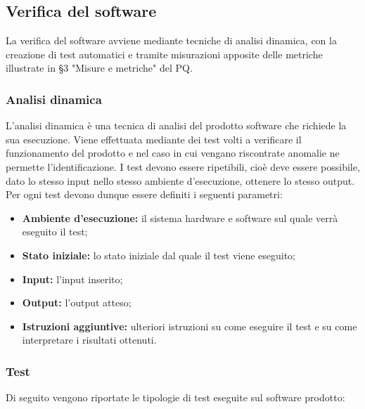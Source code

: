 \documentclass[../NormediProgetto.tex]{subfiles}
\begin{document}
\subsection{Verifica del software}

La verifica del software avviene mediante tecniche di analisi dinamica, con la creazione di test automatici e tramite misurazioni apposite delle metriche illustrate in §3 "Misure e metriche" del PQ.

\subsubsection{Analisi dinamica}

L’analisi dinamica è una tecnica di analisi del prodotto software che richiede la sua esecuzione. Viene effettuata mediante dei test volti a verificare il funzionamento del prodotto e nel caso in cui vengano riscontrate anomalie ne permette l’identificazione. I test devono essere ripetibili, cioè deve essere possibile, dato lo stesso input nello stesso ambiente d'esecuzione, ottenere lo stesso output. Per ogni test devono dunque essere definiti i seguenti parametri:

\begin{itemize}
    \item \textbf{Ambiente d'esecuzione:} il sistema hardware e software sul quale verrà eseguito il test;
    \item \textbf{Stato iniziale:} lo stato iniziale dal quale il test viene eseguito;
    \item \textbf{Input:} l’input inserito;
    \item \textbf{Output:} l’output atteso;
    \item \textbf{Istruzioni aggiuntive:} ulteriori istruzioni su come eseguire il test e su come interpretare i risultati ottenuti.
\end{itemize}

\subsubsection{Test}

Di seguito vengono riportate le tipologie di test eseguite sul software prodotto:
\end{document}
